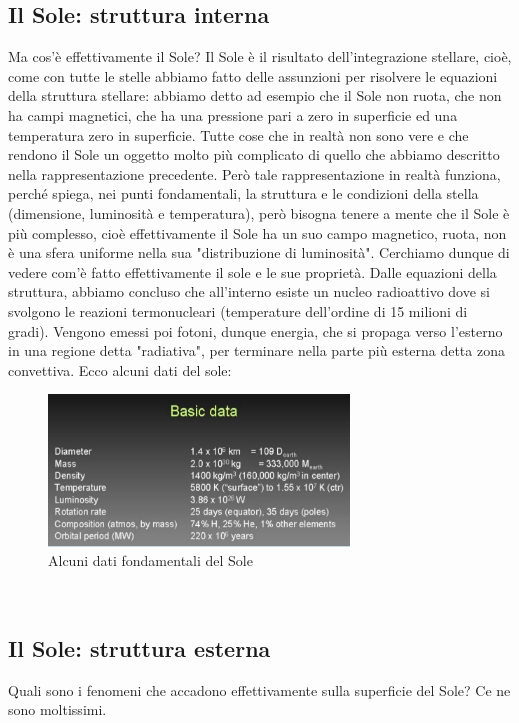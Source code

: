 \documentclass[a4paper,11pt]{article}
\begin{document}
\subsection{Il Sole: struttura interna}
        Ma cos'è effettivamente il Sole? Il Sole è il risultato dell'integrazione stellare, cioè, come con tutte le stelle abbiamo fatto delle assunzioni per risolvere le equazioni della struttura stellare: abbiamo detto ad esempio che il Sole non ruota, che non ha campi magnetici, che ha una pressione pari a zero in superficie ed una temperatura zero in superficie.
        Tutte cose che in realtà non sono vere e che rendono il Sole un oggetto molto più complicato di quello che abbiamo descritto nella rappresentazione precedente. Però tale rappresentazione in realtà funziona, perché spiega, nei punti fondamentali, la struttura e le condizioni della stella (dimensione, luminosità e temperatura), però bisogna tenere a mente che il Sole è più complesso, cioè effettivamente il Sole ha un suo campo magnetico, ruota, non è una sfera uniforme nella sua "distribuzione di luminosità".
        Cerchiamo dunque di vedere com'è fatto effettivamente il sole e le sue proprietà.
        Dalle equazioni della struttura, abbiamo concluso che all'interno esiste un nucleo radioattivo dove si svolgono le reazioni termonucleari (temperature dell'ordine di 15 milioni di gradi).
        Vengono emessi poi fotoni, dunque energia, che si propaga verso l'esterno in una regione detta "radiativa", per terminare nella parte più esterna detta zona convettiva.
        Ecco alcuni dati del sole:
        \\
        \begin{figure}[h!!]
            \centering
                \includegraphics[width=8cm]{2dic/DatiSole.jpg}
                \caption{Alcuni dati fondamentali del Sole}
            \label{fig:DatiSole}
        \end{figure}
        \\

\subsection{Il Sole: struttura esterna}
        Quali sono i fenomeni che accadono effettivamente sulla superficie del Sole?
        Ce ne sono moltissimi. \\
\end{document}
